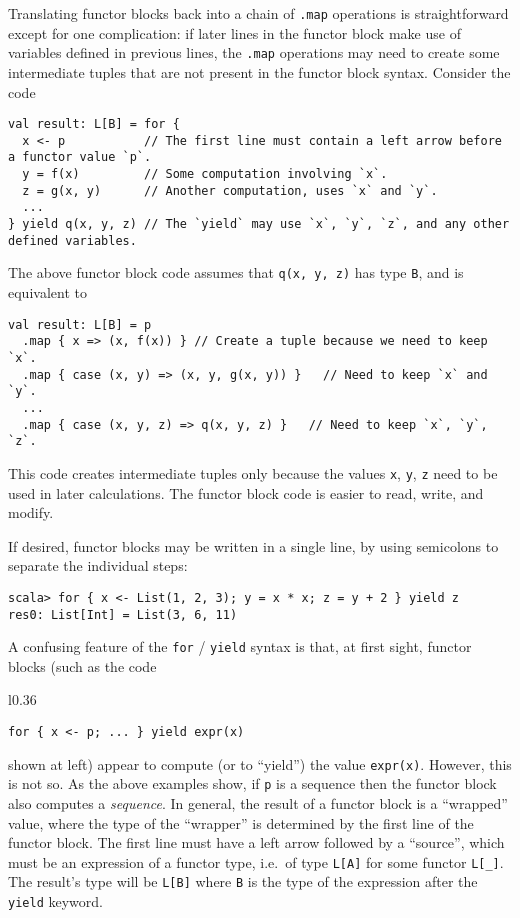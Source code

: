 Translating functor blocks back into a chain of \lstinline!.map!
operations is straightforward except for one complication: if later
lines in the functor block make use of variables defined in previous
lines, the \lstinline!.map! operations may need to create some intermediate
tuples that are not present in the functor block syntax. Consider
the code
\begin{lstlisting}
val result: L[B] = for {
  x <- p           // The first line must contain a left arrow before a functor value `p`.
  y = f(x)         // Some computation involving `x`.
  z = g(x, y)      // Another computation, uses `x` and `y`.
  ...
} yield q(x, y, z) // The `yield` may use `x`, `y`, `z`, and any other defined variables.
\end{lstlisting}
The above functor block code assumes that \lstinline!q(x, y, z)!
has type \lstinline!B!, and is equivalent to
\begin{lstlisting}
val result: L[B] = p
  .map { x => (x, f(x)) } // Create a tuple because we need to keep `x`.
  .map { case (x, y) => (x, y, g(x, y)) }   // Need to keep `x` and `y`.
  ...
  .map { case (x, y, z) => q(x, y, z) }   // Need to keep `x`, `y`, `z`.
\end{lstlisting}
This code creates intermediate tuples only because the values \lstinline!x!,
\lstinline!y!, \lstinline!z! need to be used in later calculations.
The functor block code is easier to read, write, and modify. 

If desired, functor blocks may be written in a single line, by using
semicolons to separate the individual steps:
\begin{lstlisting}
scala> for { x <- List(1, 2, 3); y = x * x; z = y + 2 } yield z
res0: List[Int] = List(3, 6, 11)
\end{lstlisting}

A confusing feature of the \lstinline!for! / \lstinline!yield! syntax
is that, at first sight, functor blocks (such as the code\begin{wrapfigure}{l}{0.36\columnwidth}%
\vspace{-0.8\baselineskip}
\begin{lstlisting}
for { x <- p; ... } yield expr(x)
\end{lstlisting}

\vspace{-0.8\baselineskip}
\end{wrapfigure}%
 shown at left) appear to compute (or to ``yield'') the value \lstinline!expr(x)!.
However, this is not so. As the above examples show, if \lstinline!p!
is a sequence then the functor block also computes a \emph{sequence}.
In general, the result of a functor block is a ``wrapped'' value,
where the type of the ``wrapper'' is determined by the first line
of the functor block. The first line must have a left arrow followed
by a ``source'', which must be an expression
of a functor type, i.e.~of type \lstinline!L[A]! for some functor
\lstinline!L[_]!. The result's type will be \lstinline!L[B]! where
\lstinline!B! is the type of the expression after the \lstinline!yield!
keyword.

